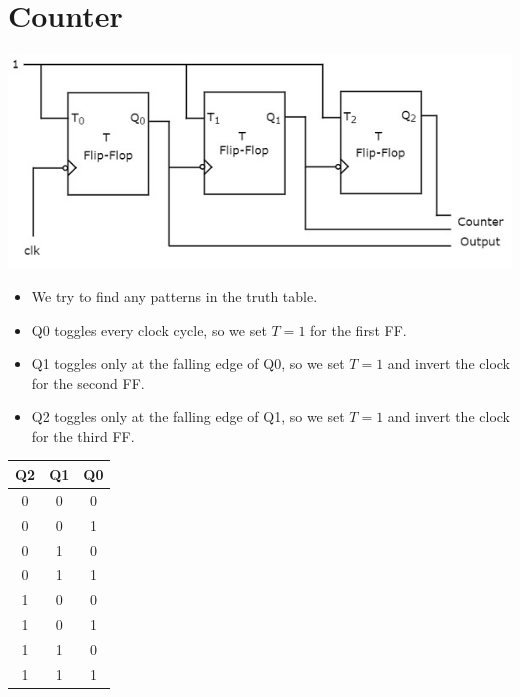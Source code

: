 \documentclass[11pt]{article}
\begin{document}
\section*{Counter}
\begin{center}
    \includegraphics[width=0.9\linewidth]{counter.jpg}
\end{center}

\noindent
\begin{minipage}[t]{0.55\textwidth}
    \vspace*{-90pt}
    \begin{itemize}
        \item We try to find any patterns in the truth table.
        \item Q0 toggles every clock cycle, so we set \(T = 1\) for the first FF.
        \item Q1 toggles only at the falling edge of Q0, so we set \(T = 1\) and invert the clock for the second FF.
        \item Q2 toggles only at the falling edge of Q1, so we set \(T = 1\) and invert the clock for the third FF.
    \end{itemize}
\end{minipage}%
\hfill
\begin{minipage}[t]{0.4\textwidth}
    \centering
    \begin{tabular}{|c|c|c|}
        \hline
        Q2 & Q1 & Q0 \\
        \hline
        0 & 0 & 0 \\
        0 & 0 & 1 \\
        0 & 1 & 0 \\
        0 & 1 & 1 \\
        1 & 0 & 0 \\
        1 & 0 & 1 \\
        1 & 1 & 0 \\
        1 & 1 & 1 \\
        \hline
    \end{tabular}
\end{minipage}
\end{document}

